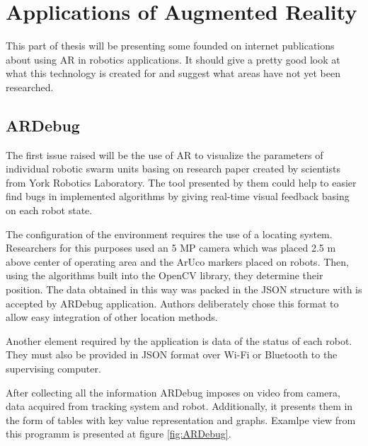 \documentclass[printmode,en]{mgr}
\begin{document}
\begin{landscape}
\begin{table}[]
\centering
{}
\caption{Placeholder}
\label{tab:ARSoftware}
\end{table}
\end{landscape}

\chapter{Applications of Augmented Reality}
This part of thesis will be presenting some founded on internet publications about using AR in robotics applications. It should give a pretty good look at what this technology is created for and suggest what areas have not yet been researched.

\section{ARDebug}
The first issue raised will be the use of AR to visualize the parameters of individual robotic swarm units basing on research paper \cite{ARDebug} created by scientists from York Robotics Laboratory. The tool presented by them could help to easier find bugs in implemented algorithms by giving real-time visual feedback basing on each robot state.

The configuration of the environment requires the use of a locating system. Researchers for this purposes used an 5 MP camera which was placed 2.5 m above center of operating area and the ArUco markers placed on robots. Then, using the algorithms built into the OpenCV library, they determine their position. The data obtained in this way was packed in the JSON structure with is accepted by ARDebug application. Authors deliberately chose this format to allow easy integration of other location methods.

Another element required by the application is data of the status of each robot. They must also be provided in JSON format over Wi-Fi or Bluetooth to the supervising computer.

After collecting all the information ARDebug imposes on video from camera, data acquired from tracking system and robot. Additionally, it presents them in the form of tables with key value representation and graphs. Examlpe view from this programm is presented at figure \ref{fig:ARDebug}.
\end{document}
